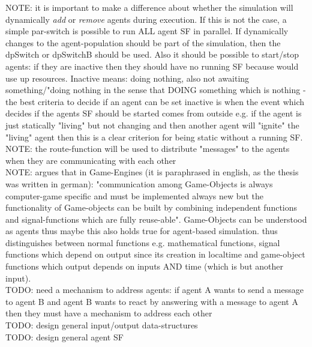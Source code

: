 NOTE: it is important to make a difference about whether the simulation will dynamically \textit{add} or \textit{remove} agents during execution. If this is not the case, a simple par-switch is possible to run ALL agent SF in parallel. If dynamically changes to the agent-population should be part of the simulation, then the dpSwitch or dpSwitchB should be used. Also it should be possible to start/stop agents: if they are inactive then they should have no running SF because would use up resources. Inactive means: doing nothing, also not awaiting something/"doing nothing in the sense that DOING something which is nothing - the best criteria to decide if an agent can be set inactive is when the event which decides if the agents SF should be started comes from outside e.g. if the agent is just statically "living" but not changing and then another agent will "ignite" the "living" agent then this is a clear criterion for being static without a running SF. \\

NOTE: the route-function will be used to distribute "messages" to the agents when they are communicating with each other \\

NOTE: \cite{Meisinger2010} argues that in Game-Engines (it is paraphrased in english, as the thesis was written in german): "communication among Game-Objects is always computer-game specific and must be implemented always new but the functionality of Game-objects can be built by combining independent functions and signal-functions which are fully reuse-able". Game-Objects can be understood as agents thus maybe this also holds true for agent-based simulation. \cite{Meisinger2010} thus distinguishes between normal functions e.g. mathematical functions, signal functions which depend on output since its creation in localtime and game-object functions which output depends on inputs AND time (which is but another input). \\

TODO: need a mechanism to address agents: if agent A wants to send a message to agent B and agent B wants to react by answering with a message to agent A then they must have a mechanism to address each other \\

TODO: design general input/output data-structures \\

TODO: design general agent SF \\


